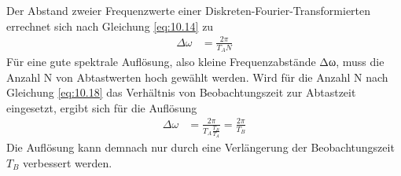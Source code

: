 Der Abstand zweier Frequenzwerte einer Diskreten-Fourier-Transformierten errechnet sich nach Gleichung \eqref{eq:10.14} zu
\begin{align}
\Delta\omega &= \frac{2  \pi}{T_{A}  N} \label{eq:10.18}
\end{align}
Für eine gute spektrale Auflösung, also kleine Frequenzabstände Δω, muss die Anzahl N von Abtastwerten hoch gewählt werden. Wird für die Anzahl N nach Gleichung \eqref{eq:10.18} das Verhältnis von Beobachtungszeit zur Abtastzeit eingesetzt, ergibt sich für die Auflösung
\begin{align}
\Delta\omega &= \frac{2  \pi}{T_{A}  \frac{T_{B}}{T_{A}}} = \frac{2  \pi}{T_{B}} \label{eq:10.19}
\end{align}
Die Auflösung kann demnach nur durch eine Verlängerung der Beobachtungszeit \(T_{B}\) verbessert werden.

